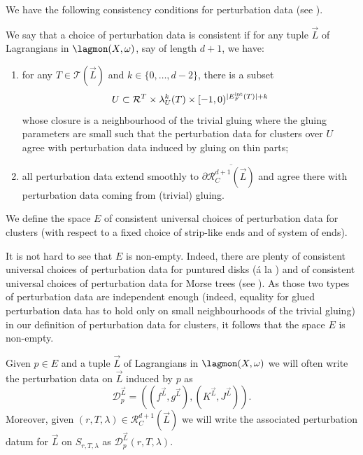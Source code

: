 We have the following consistency conditions for perturbation data (see \cite{Mescher2018PerturbedCohomology, Sheridan2011OnPants}). %
\begin{dfn}
	We say that a choice of perturbation data is consistent if for any tuple $\vec{L}$ of Lagrangians in $\lagmon(X,\omega)$, say of length $d+1$, we have:\begin{enumerate}
		\item for any $T\in \mathcal{T}(\vec{L})$ and $k\in \{0,\ldots, d-2\}$, there is a subset $$U\subset \mathcal{R}^T\times \lambda^k_U(T)\times [-1,0)^{|E_F^\textnormal{int}(T)|+k}$$ whose closure is a neighbourhood of the trivial gluing where the gluing parameters are small such that the perturbation data for clusters over $U$ agree with perturbation data induced by gluing on thin parts;
		\item all perturbation data extend smoothly to $\partial\overline{\mathcal{R}^{d+1}_C(\vec{L})}$ and agree there with perturbation data coming from (trivial) gluing.
	\end{enumerate}
	\noindent We define the space $E$ of consistent universal choices of perturbation data for clusters (with respect to a fixed choice of strip-like ends and of system of ends).
	
	\begin{rem}
		It is not hard to see that $E$ is non-empty. Indeed, there are plenty of consistent universal choices of perturbation data for puntured disks (\'a la \cite{Se:book-fukaya-categ}) and of consistent universal choices of perturbation data for Morse trees (see \cite{Mescher2018PerturbedCohomology}). As those two types of perturbation data are independent enough (indeed, equality for glued perturbation data has to hold only on small neighbourhoods of the trivial gluing) in our definition of perturbation data for clusters, it follows that the space $E$ is non-empty.
	\end{rem}
\end{dfn} Given $p\in E$ and a tuple $\vec{L}$ of Lagrangians in $\lagmon(X,\omega)$ we will often write the perturbation data on $\vec{L}$ induced by $p$ as $$\mathcal{D}^{\vec{L}}_p= \left(\left(f^{\vec{L}},g^{\vec{L}}\right),\left(K^{\vec{L}},J^{\vec{L}}\right)\right).$$ Moreover, given $(r,T,\lambda)\in \mathcal{R}^{d+1}_C(\vec{L})$ we will write the associated perturbation datum for $\vec{L}$ on $S_{r,T,\lambda}$ as $\mathcal{D}^{\vec{L}}_p(r,T,\lambda)$.

